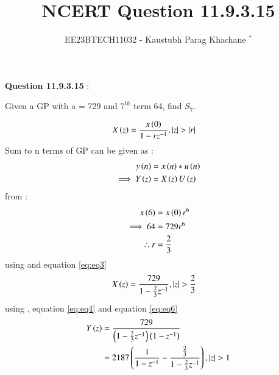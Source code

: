 \documentclass[journal,12pt,twocolumn]{IEEEtran}
\theoremstyle{remark}
\begin{document}

\vspace{3cm}

\Large\title{NCERT Question 11.9.3.15}
\large\author{EE23BTECH11032 - Kaustubh Parag Khachane $^{*}$%
}
\maketitle
\newpage
\bigskip

\renewcommand{\thefigure}{\theenumi}
\renewcommand{\thetable}{\theenumi}
\large\textbf{Question 11.9.3.15} :

Given a GP with a = 729 and $7^{th}$ term 64, find $S_7$.

\solution


\begin{align}
   & X\left(z\right) = \frac{x\left(0\right)}{1 - rz^{-1}} , \left\vert z\right\vert > \left\vert r\right\vert\label{eq:eq3}
\end{align}
 Sum to n terms of GP can be given as :
\begin{align}
    y\left(n\right) &= x\left(n\right)*u\left(n\right)\\
    \implies  Y\left(z\right) &= X\left(z\right)U\left(z\right)\label{eq:eq4}
\end{align}
from  :
\begin{align}
	x\left(6\right) &= x\left(0\right)r^6\\
	\implies 64 &= 729r^6\\
	\therefore r &= \frac{2}{3}\label{eq:eq2}
\end{align}
using  and equation \eqref{eq:eq3}
\begin{align}
    &X\left(z\right) = \frac{729}{1 - \frac{2}{3}z^{-1}}\label{eq:eq6},\left\vert z\right\vert > \frac{2}{3}
\end{align}
using , equation \eqref{eq:eq4} and equation \eqref{eq:eq6}
\begin{align}
    Y\left(z\right) &= \frac{729}{\left(1 - \frac{2}{3}z^{-1}\right)\left(1-z^{-1}\right)}\\
    &= 2187\left(\frac{1}{1-z^{-1}} - \frac{\frac{2}{3}}{1 - \frac{2}{3}z^{-1}}\right) \label{eq:eq5},\left\vert z\right\vert  > 1
\end{align}
\end{document}
